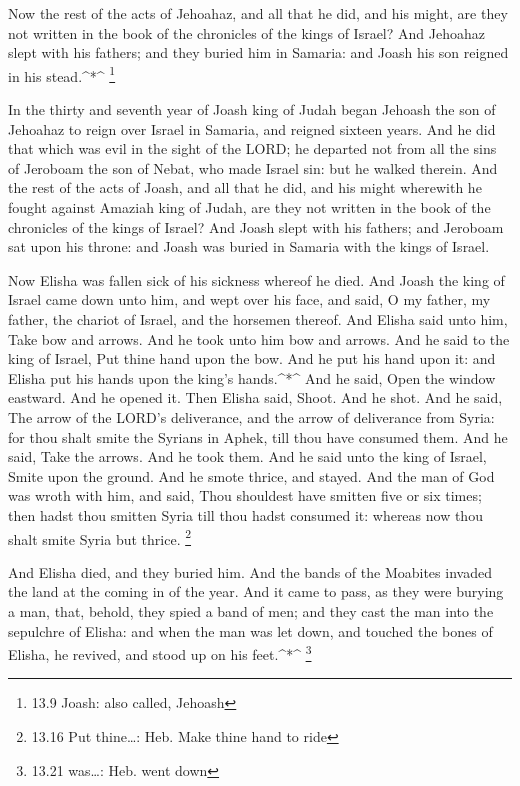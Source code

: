  Now the rest of the acts of Jehoahaz, and all that he did,
and his might, are they not written in the book of the chronicles of the
kings of Israel?  And Jehoahaz slept with his fathers; and
they buried him in Samaria: and Joash his son reigned in his
stead.\^{}*\^{} \footnote{13.9 Joash: also called, Jehoash}

 In the thirty and seventh year of Joash king of Judah
began Jehoash the son of Jehoahaz to reign over Israel in Samaria, and
reigned sixteen years.  And he did that which was evil in
the sight of the LORD; he departed not from all the sins of Jeroboam the
son of Nebat, who made Israel sin: but he walked therein. 
And the rest of the acts of Joash, and all that he did, and his might
wherewith he fought against Amaziah king of Judah, are they not written
in the book of the chronicles of the kings of Israel?  And
Joash slept with his fathers; and Jeroboam sat upon his throne: and
Joash was buried in Samaria with the kings of Israel.

 Now Elisha was fallen sick of his sickness whereof he
died. And Joash the king of Israel came down unto him, and wept over his
face, and said, O my father, my father, the chariot of Israel, and the
horsemen thereof.  And Elisha said unto him, Take bow and
arrows. And he took unto him bow and arrows.  And he said
to the king of Israel, Put thine hand upon the bow. And he put his hand
upon it: and Elisha put his hands upon the king's hands.\^{}*\^{}
 And he said, Open the window eastward. And he opened it.
Then Elisha said, Shoot. And he shot. And he said, The arrow of the
LORD's deliverance, and the arrow of deliverance from Syria: for thou
shalt smite the Syrians in Aphek, till thou have consumed them.
 And he said, Take the arrows. And he took them. And he
said unto the king of Israel, Smite upon the ground. And he smote
thrice, and stayed.  And the man of God was wroth with him,
and said, Thou shouldest have smitten five or six times; then hadst thou
smitten Syria till thou hadst consumed it: whereas now thou shalt smite
Syria but thrice. \footnote{13.16 Put thine\ldots: Heb. Make thine hand
  to ride}

 And Elisha died, and they buried him. And the bands of the
Moabites invaded the land at the coming in of the year. 
And it came to pass, as they were burying a man, that, behold, they
spied a band of men; and they cast the man into the sepulchre of Elisha:
and when the man was let down, and touched the bones of Elisha, he
revived, and stood up on his feet.\^{}*\^{} \footnote{13.21 was\ldots:
  Heb. went down}

